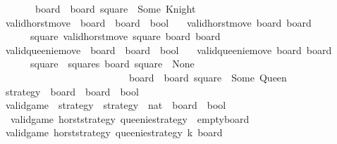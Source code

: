 \begin{isabellebody}
\ \ \ \ \ \ \ board{\isacharprime}\ {\isacharequal}\ board\ {\isacharparenleft}square\ {\isacharcolon}{\isacharequal}\ Some\ Knight{\isacharparenright}{\isachardoublequoteclose}\isanewline
\isanewline
{}\isamarkupfalse%
\ valid{\isacharunderscore}horst{\isacharunderscore}move\ {\isacharcolon}{\isacharcolon}\ {\isachardoublequoteopen}board\ {\isasymRightarrow}\ board\ {\isasymRightarrow}\ bool{\isachardoublequoteclose}\ \isanewline
\ \ {\isachardoublequoteopen}valid{\isacharunderscore}horst{\isacharunderscore}move\ board\ board{\isacharprime}\ {\isasymlongleftrightarrow}\ \isanewline
\ \ \ \ \ {\isacharparenleft}{\isasymexists}\ square{\isachardot}\ valid{\isacharunderscore}horst{\isacharunderscore}move{\isacharprime}\ square\ board\ board{\isacharprime}{\isacharparenright}{\isachardoublequoteclose}\isanewline
\isanewline
{}\isamarkupfalse%
\ valid{\isacharunderscore}queenie{\isacharunderscore}move\ {\isacharcolon}{\isacharcolon}\ {\isachardoublequoteopen}board\ {\isasymRightarrow}\ board\ {\isasymRightarrow}\ bool{\isachardoublequoteclose}\ \isanewline
\ \ {\isachardoublequoteopen}valid{\isacharunderscore}queenie{\isacharunderscore}move\ board\ board{\isacharprime}\ {\isasymlongleftrightarrow}\ \isanewline
\ \ \ \ \ {\isacharparenleft}{\isasymexists}\ square\ {\isasymin}\ squares{\isachardot}\ board\ square\ {\isacharequal}\ None\ {\isasymand}\ \isanewline
\ \ \ \ \ \ \ \ \ \ \ \ \ \ \ \ \ \ \ \ \ \ \ \ \ \ board{\isacharprime}\ {\isacharequal}\ board\ {\isacharparenleft}square\ {\isacharcolon}{\isacharequal}\ Some\ Queen{\isacharparenright}{\isacharparenright}{\isachardoublequoteclose}\isanewline
\isanewline
{}\isamarkupfalse%
\ strategy\ {\isacharequal}\ {\isachardoublequoteopen}board\ {\isasymRightarrow}\ board\ {\isasymRightarrow}\ bool{\isachardoublequoteclose}\isanewline
\isanewline
{}\isamarkupfalse%
\ valid{\isacharunderscore}game\ {\isacharcolon}{\isacharcolon}\ {\isachardoublequoteopen}strategy\ {\isasymRightarrow}\ strategy\ {\isasymRightarrow}\ nat\ {\isasymRightarrow}\ board\ {\isasymRightarrow}\ bool{\isachardoublequoteclose}\ \isanewline
\ \ {\isachardoublequoteopen}valid{\isacharunderscore}game\ horst{\isacharunderscore}strategy\ queenie{\isacharunderscore}strategy\ {}\ empty{\isacharunderscore}board{\isachardoublequoteclose}\isanewline
{\isacharbar}\ {\isachardoublequoteopen}{\isasymlbrakk}valid{\isacharunderscore}game\ horst{\isacharunderscore}strategy\ queenie{\isacharunderscore}strategy\ k\ board{\isacharsemicolon}\ \isanewline

\end{isabellebody}
